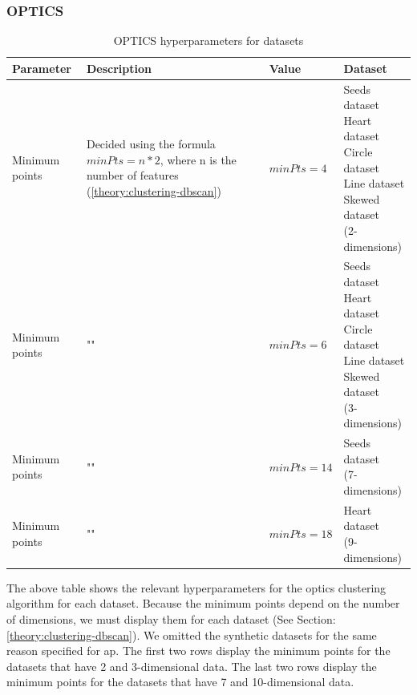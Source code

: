 \subsubsection{OPTICS}

\begin{table}[h]
  \begin{tabular}{|l|p{6cm}|l|l|}
    \hline
    Parameter      & Description                                                                                                    & Value       & Dataset                    \\
    \hline
    Minimum points & Decided using the formula $minPts = n * 2$, where n is the number of features (\ref{theory:clustering-dbscan}) & $minPts=4$  & \makecell[l]{Seeds dataset \\ Heart dataset \\ Circle dataset \\ Line dataset \\ Skewed dataset \\ (2-dimensions)}  \\
    \hline
    Minimum points & ""                                                                                                             & $minPts=6$  & \makecell[l]{Seeds dataset \\ Heart dataset \\ Circle dataset \\ Line dataset \\ Skewed dataset \\ (3-dimensions)} \\
    \hline
    Minimum points & ""                                                                                                             & $minPts=14$ & \makecell[l]{Seeds dataset \\ (7-dimensions)}  \\
    \hline
    Minimum points & ""                                                                                                             & $minPts=18$ & \makecell[l]{Heart dataset \\ (9-dimensions)} \\
    \hline
  \end{tabular}
  \caption{OPTICS  hyperparameters for datasets}
  \label{tab:dbscan-formula-sklearn}
\end{table}
The above table shows the relevant hyperparameters for the \gls{optics} clustering algorithm for each dataset.
Because the minimum points depend on the number of dimensions, we must display them for each dataset (See Section: \ref{theory:clustering-dbscan}).
We omitted the synthetic datasets for the same reason specified for \gls{ap}.
The first two rows display the minimum points for the datasets that have 2 and 3-dimensional data.
The last two rows display the minimum points for the datasets that have 7 and 10-dimensional data.
\newpage
